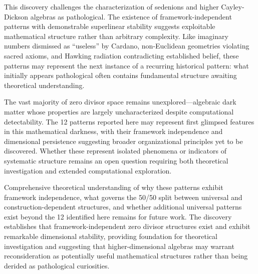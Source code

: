 \documentclass[11pt]{article}
\begin{document}
This discovery challenges the characterization of sedenions and higher Cayley-Dickson algebras as pathological. The existence of framework-independent patterns with demonstrable superlinear stability suggests exploitable mathematical structure rather than arbitrary complexity. Like imaginary numbers dismissed as ``useless'' by Cardano, non-Euclidean geometries violating sacred axioms, and Hawking radiation contradicting established belief, these patterns may represent the next instance of a recurring historical pattern: what initially appears pathological often contains fundamental structure awaiting theoretical understanding.

The vast majority of zero divisor space remains unexplored---algebraic dark matter whose properties are largely uncharacterized despite computational detectability. The 12 patterns reported here may represent first glimpsed features in this mathematical darkness, with their framework independence and dimensional persistence suggesting broader organizational principles yet to be discovered. Whether these represent isolated phenomena or indicators of systematic structure remains an open question requiring both theoretical investigation and extended computational exploration.

Comprehensive theoretical understanding of why these patterns exhibit framework independence, what governs the 50/50 split between universal and construction-dependent structures, and whether additional universal patterns exist beyond the 12 identified here remains for future work. The discovery establishes that framework-independent zero divisor structures exist and exhibit remarkable dimensional stability, providing foundation for theoretical investigation and suggesting that higher-dimensional algebras may warrant reconsideration as potentially useful mathematical structures rather than being derided as pathological curiosities.
\end{document}
